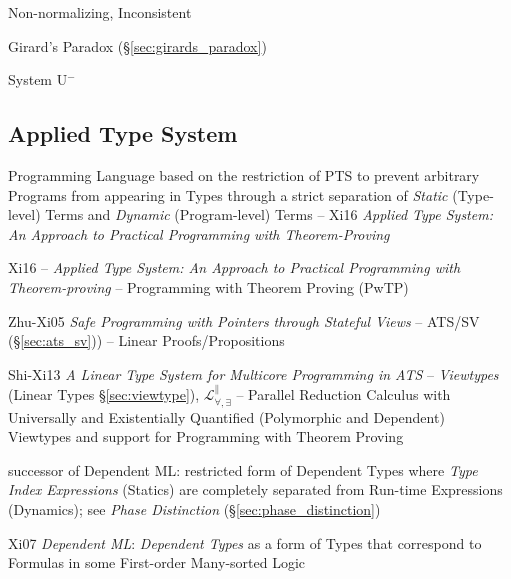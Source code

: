 Non-normalizing, Inconsistent

Girard's Paradox (\S\ref{sec:girards_paradox})

System U$^-$



\subsection{Applied Type System}\label{sec:ats}

\begingroup

\newcommand{\lam}{\mathsf{lam}}
\newcommand{\app}{\mathsf{app}}
\newcommand{\slam}{\mathsf{slam}}
\newcommand{\sapp}{\mathsf{sapp}}
\renewcommand{\lett}{\mathsf{let}}
\renewcommand{\inn}{\mathsf{in}}
\newcommand{\INT}{\mathsf{int}}
\newcommand{\BOOL}{\mathsf{bool}}
\newcommand{\Int}{\mathsf{Int}}
\newcommand{\Bool}{\mathsf{Bool}}
\renewcommand{\Nat}{\mathsf{Nat}}
\newcommand{\dtree}{\mathscr{D}}

Programming Language based on the restriction of PTS to prevent
arbitrary Programs from appearing in Types through a strict separation
of \emph{Static} (Type-level) Terms and \emph{Dynamic} (Program-level)
Terms -- Xi16 \emph{Applied Type System: An Approach to Practical
  Programming with Theorem-Proving}

Xi16 -- \emph{Applied Type System: An Approach to Practical
  Programming with Theorem-proving} -- Programming with Theorem
Proving (PwTP)

Zhu-Xi05 \emph{Safe Programming with Pointers through Stateful
  Views} -- ATS/SV (\S\ref{sec:ats_sv})) -- Linear Proofs/Propositions

Shi-Xi13 \emph{A Linear Type System for Multicore Programming in ATS}
-- \emph{Viewtypes} (Linear Types \S\ref{sec:viewtype}),
$\mathcal{L}^\parallel_{\forall, \exists}$ -- Parallel Reduction
Calculus with Universally and Existentially Quantified (Polymorphic
and Dependent) Viewtypes and support for Programming with Theorem
Proving

successor of Dependent ML: restricted form of Dependent Types where
\emph{Type Index Expressions} (Statics) are completely separated from
Run-time Expressions (Dynamics); see \emph{Phase Distinction}
(\S\ref{sec:phase_distinction})

Xi07 \emph{Dependent ML}: \emph{Dependent Types} as a form of Types
that correspond to Formulas in some First-order Many-sorted Logic %

